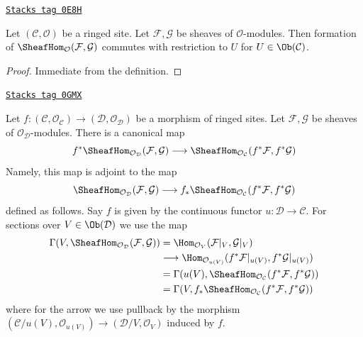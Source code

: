 \begin{lemma}
\label{sites-modules-lemma-internal-hom-restriction}
\href{https://stacks.math.columbia.edu/tag/0E8H}{\texttt{Stacks tag 0E8H}}

Let $(\mathcal{C}, \mathcal{O})$ be a ringed site.
Let $\mathcal{F}, \mathcal{G}$ be sheaves of $\mathcal{O}$-modules.
Then formation of $\SheafHom_\mathcal{O}(\mathcal{F}, \mathcal{G})$
commutes with restriction to $U$ for $U \in \Ob(\mathcal{C})$.
\end{lemma}

\begin{proof}
Immediate from the definition.
\end{proof}

\begin{remark}
\label{sites-modules-remark-pullback-internal-hom}
\href{https://stacks.math.columbia.edu/tag/0GMX}{\texttt{Stacks tag 0GMX}}

Let $f : (\mathcal{C}, \mathcal{O}_\mathcal{C}) \to
(\mathcal{D}, \mathcal{O}_\mathcal{D})$ be a morphism
of ringed sites. Let
$\mathcal{F}, \mathcal{G}$ be sheaves of $\mathcal{O}_\mathcal{D}$-modules.
There is a canonical map
$$
f^*\SheafHom_{\mathcal{O}_\mathcal{D}}(\mathcal{F}, \mathcal{G})
\longrightarrow
\SheafHom_{\mathcal{O}_\mathcal{C}}(f^*\mathcal{F}, f^*\mathcal{G})
$$
Namely, this map is adjoint to the map
$$
\SheafHom_{\mathcal{O}_\mathcal{D}}(\mathcal{F}, \mathcal{G})
\longrightarrow
f_*\SheafHom_{\mathcal{O}_\mathcal{C}}(f^*\mathcal{F}, f^*\mathcal{G})
$$
defined as follows. Say $f$ is given by the continuous functor
$u : \mathcal{D} \to \mathcal{C}$. For sections over $V \in \Ob(\mathcal{D})$
we use the map
\begin{align*}
\Gamma(V, \SheafHom_{\mathcal{O}_\mathcal{D}}(\mathcal{F}, \mathcal{G}))
& =
\Hom_{\mathcal{O}_V}(\mathcal{F}|_V, \mathcal{G}|_V) \\
& \longrightarrow
\Hom_{\mathcal{O}_{u(V)}}(f^*\mathcal{F}|_{u(V)}, f^*\mathcal{G}|_{u(V)}) \\
& =
\Gamma(u(V), \SheafHom_{\mathcal{O}_\mathcal{C}}(f^*\mathcal{F},
f^*\mathcal{G})) \\
& =
\Gamma(V, f_*\SheafHom_{\mathcal{O}_\mathcal{C}}(f^*\mathcal{F},
f^*\mathcal{G}))
\end{align*}
where for the arrow we use pullback by the morphism
$(\mathcal{C}/u(V), \mathcal{O}_{u(V)}) \to
(\mathcal{D}/V, \mathcal{O}_V)$ induced by $f$.
\end{remark}


